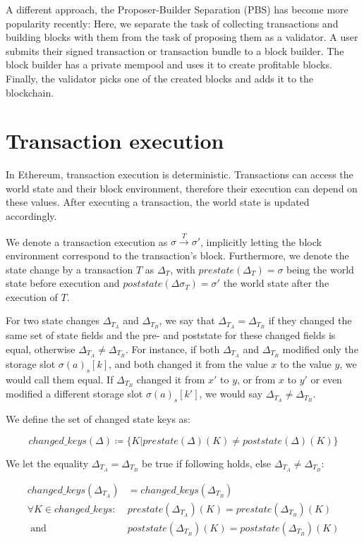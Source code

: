 \documentclass[draft,final]{vutinfth} %
\begin{document}
A different approach, the Proposer-Builder Separation (PBS) has become more popularity recently: Here, we separate the task of collecting transactions and building blocks with them from the task of proposing them as a validator. A user submits their signed transaction or transaction bundle to a block builder. The block builder has a private mempool and uses it to create profitable blocks. Finally, the validator picks one of the created blocks and adds it to the blockchain. \cite{heimbach_ethereums_2023}

\section{Transaction execution}

In Ethereum, transaction execution is deterministic. \cite[p.9]{wood_ethereum_2024} Transactions can access the world state and their block environment, therefore their execution can depend on these values. After executing a transaction, the world state is updated accordingly.

We denote a transaction execution as $\sigma \xrightarrow{T} \sigma\prime$, implicitly letting the block environment correspond to the transaction's block. Furthermore, we denote the state change by a transaction $T$ as $\Delta_T$, with $prestate(\Delta_T) = \sigma$ being the world state before execution and $poststate(\Delta\sigma_T) = \sigma\prime$ the world state after the execution of $T$.

For two state changes $\Delta_{T_A}$ and $\Delta_{T_B}$, we say that $\Delta_{T_A} = \Delta_{T_B}$ if they changed the same set of state fields and the pre- and poststate for these changed fields is equal, otherwise $\Delta_{T_A} \neq \Delta_{T_B}$. For instance, if both $\Delta_{T_A}$ and $\Delta_{T_B}$ modified only the storage slot $\sigma(a)_s[k]$, and both changed it from the value $x$ to the value $y$, we would call them equal. If $\Delta_{T_B}$ changed it from $x\prime$ to $y$, or from $x$ to $y\prime$ or even modified a different storage slot $\sigma(a)_s[k\prime]$, we would say $\Delta_{T_A} \neq \Delta_{T_B}$.

We define the set of changed state keys as:

$$changed\_keys(\Delta) \coloneqq \{ K | prestate(\Delta)(K) \neq poststate(\Delta)(K) \}$$

We let the equality $\Delta_{T_A} = \Delta_{T_B}$ be true if following holds, else $\Delta_{T_A} \neq \Delta_{T_B}$:

\begin{align*}
    changed\_keys(\Delta_{T_A})       & = changed\_keys(\Delta_{T_B})                           \\
    \forall K \in changed\_keys\colon &
    prestate(\Delta_{T_A})(K) = prestate(\Delta_{T_B})(K)                                       \\
    \text{ and }                      & poststate(\Delta_{T_B})(K) = poststate(\Delta_{T_B})(K)
\end{align*}
\end{document}

